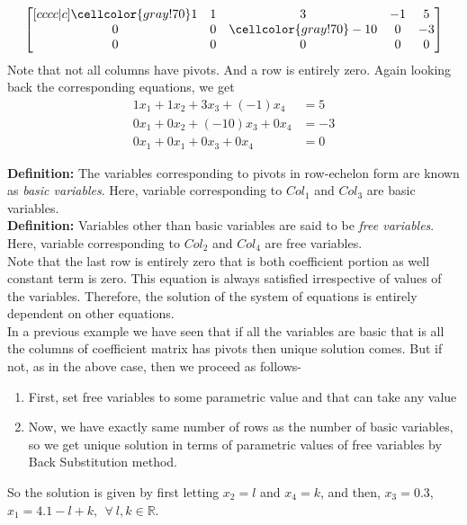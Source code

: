 \documentclass{article}
\newcommand\bg{\cellcolor{gray!70}} %
\begin{document}
\begin{align}
\begin{bmatrix}[cccc|c] 
 \bg1 & 1 & 3 & -1 & 5 \\
 0 & 0 & \bg-10 & 0 & -3 \\
 0 & 0 & 0 & 0 & 0 
\end{bmatrix}\label{ef1}
\end{align}
Note that not all columns have pivots. And a row is entirely zero. Again looking back the corresponding equations, we get\\
\begin{align}
1x_1 + 1x_2 + 3x_3 +(-1)x_4 &= 5 \nonumber\\
0x_1 + 0x_2 + (-10)x_3 + 0x_4 &= -3 \nonumber\\
0x_1 + 0x_1 + 0x_3 + 0x_4 &= 0 \nonumber
\end{align}

\textbf{Definition:} The variables corresponding to pivots in row-echelon form are known as \textit{basic variables}. Here, variable corresponding to $Col_1$ and $Col_3$ are basic variables.\\

\textbf{Definition:} Variables other than basic variables are said to be \textit{free variables}.  Here, variable corresponding to $Col_2$ and $Col_4$ are free variables.\\

Note that the last row is entirely zero that is both coefficient portion as well constant term is zero. This equation is always satisfied irrespective of values of the variables. Therefore, the solution of the system of equations is entirely dependent on other equations.\\

In a previous example we have seen that if all the variables are basic that is all the columns of coefficient matrix has pivots then unique solution comes. But if not, as in the above case, then we proceed as follows- 
\begin{enumerate}
    \item First, set free variables to some parametric value and that can take any value
    \item Now, we have exactly same number of rows as the number of basic variables, so we get unique solution in terms of parametric values of free variables by Back Substitution method. 
\end{enumerate}
So the solution is given by first letting $x_2=l$ and $x_4=k$, and then, $x_3=0.3$, $x_1=4.1-l+k, ~~\forall~l,k\in \mathbb{R}$.\\
\end{document}
